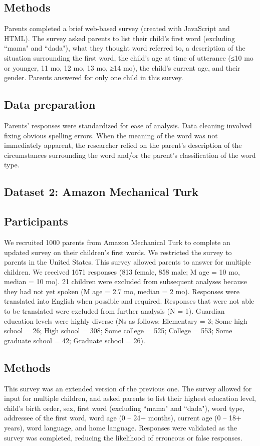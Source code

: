 \documentclass[10pt,letterpaper]{article}
\begin{document}
\subsection{Methods}
Parents completed a brief web-based survey (created with JavaScript and HTML). The survey asked parents to list their child's first word (excluding ``mama" and ``dada"), what they thought word referred to, a description of the situation surrounding the first word, the child's age at time of utterance (≤10 mo or younger, 11 mo, 12 mo, 13 mo, ≥14 mo), the child's current age, and their gender. Parents answered for only one child in this survey.

\subsection{Data preparation}
Parents' responses were standardized for ease of analysis. Data cleaning involved fixing obvious spelling errors. When the meaning of the word was not immediately apparent, the researcher relied on the parent's description of the circumstances surrounding the word and/or the parent's classification of the word type.

\subsection{Dataset 2: Amazon Mechanical Turk}

\subsection{Participants}
We recruited 1000 parents from Amazon Mechanical Turk to complete an updated survey on their children's first words. We restricted the survey to parents in the United States. This survey allowed parents to answer for multiple children. We received 1671 responses (813 female, 858 male; M age = 10 mo, median = 10 mo). 21 children were excluded from subsequent analyses because they had not yet spoken (M age = 2.7 mo, median = 2 mo). Responses were translated into English when possible and required. Responses that were not able to be translated were excluded from further analysis (N = 1). Guardian education levels were highly diverse (Ns as follows: Elementary = 3; Some high school = 26; High school = 308; Some college = 525; College = 553; Some graduate school = 42; Graduate school = 26). 

\subsection{Methods}
This survey was an extended version of the previous one. The survey allowed for input for multiple children, and asked parents to list their highest education level, child's birth order, sex,  first word (excluding ``mama" and ``dada"), word type, addressee of the first word, word age (0 – 24+ months), current age (0 – 18+ years), word language, and home language.  Responses were validated as the survey was completed, reducing the likelihood of erroneous or false responses. 
\end{document}
